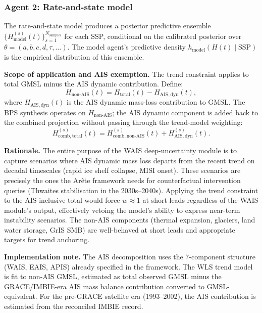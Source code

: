 \documentclass[11pt]{article}
\begin{document}
\subsubsection{Agent 2: Rate-and-state model}
\label{sec:model_agent}

The rate-and-state model produces a posterior predictive ensemble $\{H_{\mathrm{model}}^{(s)}(t)\}_{s=1}^{N_{\mathrm{samples}}}$ for each SSP, conditional on the calibrated posterior over $\theta = (a, b, c, d, \tau, \ldots)$.  The model agent's predictive density $h_{\mathrm{model}}(H(t) \mid \mathrm{SSP})$ is the empirical distribution of this ensemble.

\textbf{Scope of application and AIS exemption.}  The trend constraint applies to total GMSL minus the AIS dynamic contribution.  Define:
\begin{equation}
  H_{\mathrm{non\text{-}AIS}}(t) = H_{\mathrm{total}}(t) - H_{\mathrm{AIS,dyn}}(t),
  \label{eq:non_ais}
\end{equation}
where $H_{\mathrm{AIS,dyn}}(t)$ is the AIS dynamic mass-loss contribution to GMSL.  The BPS synthesis operates on $H_{\mathrm{non\text{-}AIS}}$; the AIS dynamic component is added back to the combined projection without passing through the trend-model weighting:
\begin{equation}
  H_{\mathrm{comb,total}}^{(s)}(t) = H_{\mathrm{comb,non\text{-}AIS}}^{(s)}(t) + H_{\mathrm{AIS,dyn}}^{(s)}(t).
  \label{eq:ais_add_back}
\end{equation}

\textbf{Rationale.}  The entire purpose of the WAIS deep-uncertainty module is to capture scenarios where AIS dynamic mass loss departs from the recent trend on decadal timescales (rapid ice shelf collapse, MISI onset).  These scenarios are precisely the ones the Ar\^ete framework needs for counterfactual intervention queries (Thwaites stabilisation in the 2030s--2040s).  Applying the trend constraint to the AIS-inclusive total would force $w \approx 1$ at short leads regardless of the WAIS module's output, effectively vetoing the model's ability to express near-term instability scenarios.  The non-AIS components (thermal expansion, glaciers, land water storage, GrIS SMB) are well-behaved at short leads and appropriate targets for trend anchoring.

\textbf{Implementation note.}  The AIS decomposition uses the 7-component structure (WAIS, EAIS, APIS) already specified in the framework.  The WLS trend model is fit to non-AIS GMSL, estimated as total observed GMSL minus the GRACE/IMBIE-era AIS mass balance contribution converted to GMSL-equivalent.  For the pre-GRACE satellite era (1993--2002), the AIS contribution is estimated from the reconciled IMBIE record.
\end{document}
